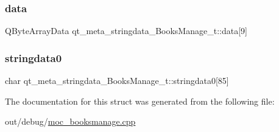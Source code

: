 \subsubsection{\texorpdfstring{data}{data}}
{\footnotesize\ttfamily Q\+Byte\+Array\+Data qt\+\_\+meta\+\_\+stringdata\+\_\+\+Books\+Manage\+\_\+t\+::data\mbox{[}9\mbox{]}}

\mbox{\label{structqt__meta__stringdata___books_manage__t_a26430339977d3ad1d58a7283bf014864}} 
\subsubsection{\texorpdfstring{stringdata0}{stringdata0}}
{\footnotesize\ttfamily char qt\+\_\+meta\+\_\+stringdata\+\_\+\+Books\+Manage\+\_\+t\+::stringdata0\mbox{[}85\mbox{]}}



The documentation for this struct was generated from the following file\+:\begin{DoxyCompactItemize}
\item 
out/debug/\mbox{\hyperlink{moc__booksmanage_8cpp}{moc\+\_\+booksmanage.\+cpp}}\end{DoxyCompactItemize}

